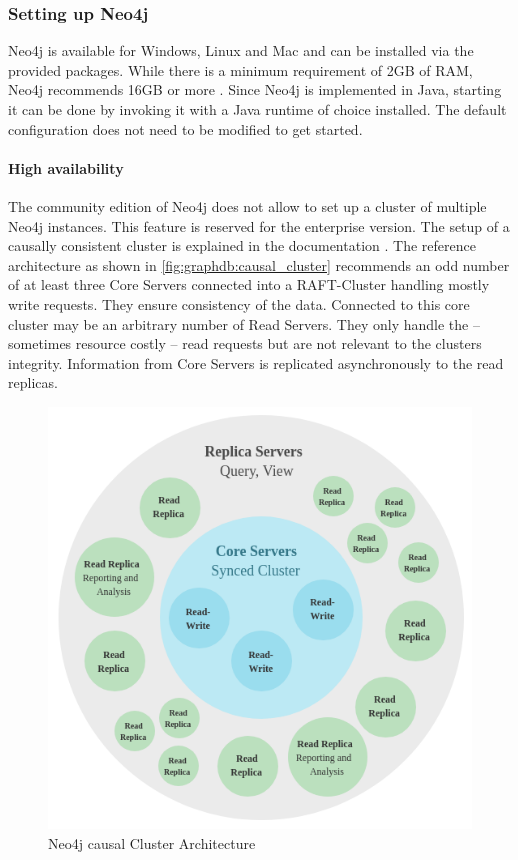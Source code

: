 \subsubsection{Setting up Neo4j}
Neo4j is available for Windows, Linux and Mac and can be installed via the provided packages. While there is a minimum requirement of 2GB of RAM, Neo4j recommends 16GB or more \autocite[Chapter~2.1]{neo4j:op_manual}.
Since Neo4j is implemented in Java, starting it can be done by invoking it with a Java runtime of choice installed. The default configuration does not need to be modified to get started.

\paragraph{High availability} \label{par:graphdb:ha} The community edition of Neo4j does not allow to set up a cluster of multiple Neo4j instances.
This feature is reserved for the enterprise version.
The setup of a causally consistent cluster is explained in the documentation \autocite[Chapter~5.1]{neo4j:op_manual}.
The reference architecture as shown in \autoref{fig:graphdb:causal_cluster} recommends an odd number of at least three \glqq Core Servers\grqq{} connected into a RAFT-Cluster handling mostly write requests.
They ensure consistency of the data.
Connected to this core cluster may be an arbitrary number of \glqq Read Servers\grqq.
They only handle the -- sometimes resource costly -- read requests but are not relevant to the clusters integrity.
Information from Core Servers is replicated asynchronously to the read replicas.
\begin{figure}[ht]
    \centering
    \includegraphics[width=.5\textwidth]{img/causal_clustering.png}
    \caption{Neo4j causal Cluster Architecture \autocite[Chapter~5.1]{neo4j:op_manual}}
    \label{fig:graphdb:causal_cluster}
\end{figure}

